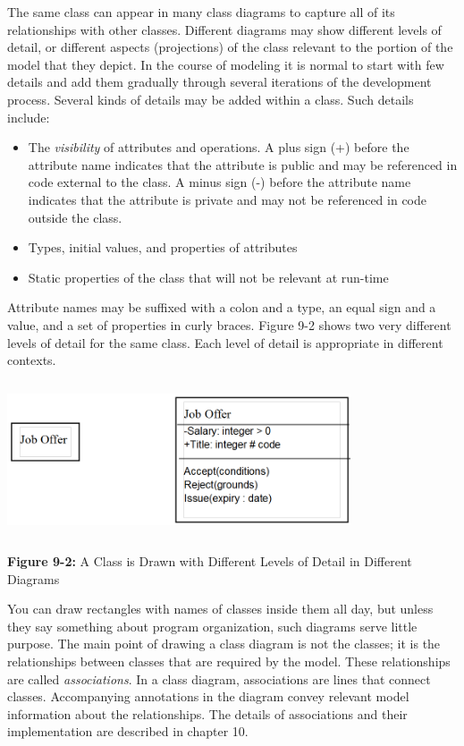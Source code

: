 The same class can appear in many class diagrams to capture all of its
relationships with other classes. Different diagrams may show different
levels of detail, or different aspects (projections) of the class
relevant to the portion of the model that they depict. In the course of
modeling it is normal to start with few details and add them gradually
through several iterations of the development process. Several kinds of
details may be added within a class. Such details include:

\begin{itemize}
\item The \textit{visibility} of
attributes and operations. A plus sign (+) before the attribute name
indicates that the attribute is public and may be
referenced in code external to the class. A minus sign
(-) before the attribute name indicates that the attribute is
private and may not be referenced in code outside the
class.
\item Types, initial values, and properties of attributes
\item Static properties of the class that will not be relevant at
run-time
\end{itemize}
Attribute names may be suffixed with a colon and a type, an equal sign
and a value, and a set of properties in curly braces. Figure 9-2 shows
two very different levels of detail for the same class. Each level of
detail is appropriate in different contexts.

\bigskip

\includegraphics[width=4in,height=1.8in]{ub-img/lodetail.png} 

{\sffamily\bfseries Figure 9-2:}
{\sffamily A Class is Drawn with Different Levels of Detail in
 Different Diagrams}

\bigskip

You can draw rectangles with names of classes inside them all day, but
unless they say something about program organization, such diagrams
serve little purpose. The main point of drawing a class diagram is not
the classes; it is the relationships between classes that are required
by the model. These relationships are called
\textit{associations}. In a class diagram,
associations are lines that connect classes. Accompanying annotations
in the diagram convey relevant model information about the
relationships. The details of associations and their implementation are
described in chapter 10.

